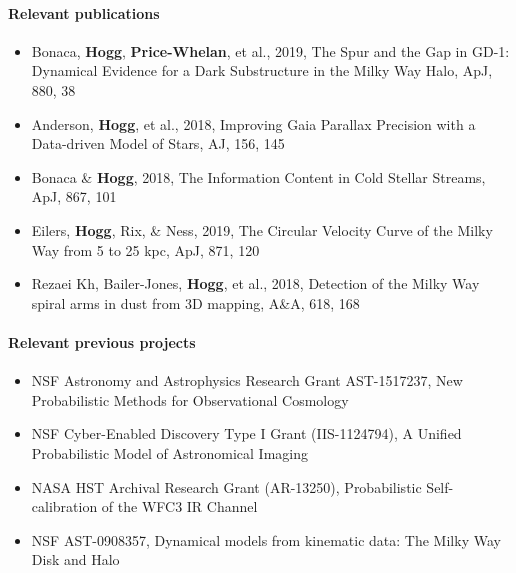 \paragraph{Relevant publications}
\begin{itemize}
    \item Bonaca, \textbf{Hogg}, \textbf{Price-Whelan}, et al., 2019, The Spur and the Gap in GD-1: Dynamical Evidence for a Dark Substructure in the Milky Way Halo, ApJ, 880, 38
    \item Anderson, \textbf{Hogg}, et al., 2018, Improving Gaia Parallax Precision with a Data-driven Model of Stars, AJ, 156, 145
    \item Bonaca \& \textbf{Hogg}, 2018, The Information Content in Cold Stellar Streams, ApJ, 867, 101
    \item Eilers, \textbf{Hogg}, Rix, \& Ness, 2019, The Circular Velocity Curve of the Milky Way from 5 to 25 kpc, ApJ, 871, 120
    \item Rezaei Kh, Bailer-Jones, \textbf{Hogg}, et al., 2018, Detection of the Milky Way spiral arms in dust from 3D mapping, A\&A, 618, 168
\end{itemize}

\paragraph{Relevant previous projects}
\begin{itemize}
    \item NSF Astronomy and Astrophysics Research Grant AST-1517237, New Probabilistic Methods for Observational Cosmology
    \item NSF Cyber-Enabled Discovery Type I Grant (IIS-1124794), A Unified Probabilistic Model of Astronomical Imaging
    \item NASA HST Archival Research Grant (AR-13250), Probabilistic Self-calibration of the WFC3 IR Channel
    \item NSF AST-0908357, Dynamical models from kinematic data: The Milky Way Disk and Halo
\end{itemize}

